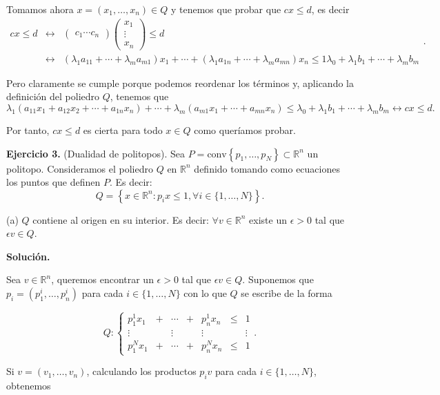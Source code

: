 \documentclass[10pt,a4paper]{article}
\begin{document}
Tomamos ahora $x=(x_1,\ldots, x_n)\in Q$ y tenemos que probar que $cx\leq d$, es decir
$$\begin{array}{rcl}cx\leq d & \longleftrightarrow & \begin{pmatrix}
c_1 \cdots  c_n\end{pmatrix}\begin{pmatrix}
x_1\\ \vdots\\ x_n
\end{pmatrix}\leq d\\ & \longleftrightarrow & (\lambda_1a_{11}+\cdots+\lambda_ma_{m1})x_1+\cdots+(\lambda_1a_{1n}+\cdots+\lambda_ma_{mn})x_n\leq 1\lambda_0+\lambda_1b_1+\cdots+\lambda_m b_m\end{array}.$$

Pero claramente se cumple porque podemos reordenar los términos y, aplicando la definición del poliedro $Q$, tenemos que 
$$\lambda_1(a_{11}x_1+a_{12}x_2+\cdots+a_{1n}x_n)+\cdots+\lambda_m(a_{m1}x_1+\cdots+a_{mn}x_n)
\leq \lambda_0+\lambda_1b_1+\cdots+\lambda_mb_m\longleftrightarrow cx\leq d.$$

Por tanto, $cx\leq d$ es cierta para todo $x\in Q$ como queríamos probar.


\textbf{Ejercicio 3.} (Dualidad de politopos). Sea $P=\text{conv}\left\{p_1,\ldots,p_N\right\}\subset\mathbb{R}^n$ un politopo. Consideramos el poliedro $Q$ en $\mathbb{R}^n$ definido tomando como ecuaciones los puntos que definen $P$. Es decir:
$$Q=\left\{x\in\mathbb{R}^n : p_ix\leq 1,\forall i\in\{1,\ldots,N\}\right\}.$$

(a) $Q$ contiene al origen en su interior. Es decir: $\forall v\in\mathbb{R}^n$ existe un $\epsilon>0$ tal que $\epsilon v\in Q$.


\textbf{Solución.}

Sea $v\in\mathbb{R}^n$, queremos encontrar un $\epsilon>0$ tal que $\epsilon v\in Q$. Suponemos que $p_i=(p_1^i,\ldots,p_n^i)$ para cada $i\in\{1,\ldots,N\}$ con lo que $Q$ se escribe de la forma

$$Q:\left\{\begin{array}{ccccccc}p^1_1x_1 &  + & \cdots & + & p_n^1x_n & \leq & 1\\
\vdots &  & \vdots &  & \vdots &  & \vdots\\
p_1^Nx_1 & + & \cdots &  + & p_n^Nx_n & \leq & 1\end{array}\right..$$

Si $v=(v_1,\ldots,v_n)$, calculando los productos $p_iv$ para cada $i\in\{1,\ldots,N\}$, obtenemos
\end{document}
